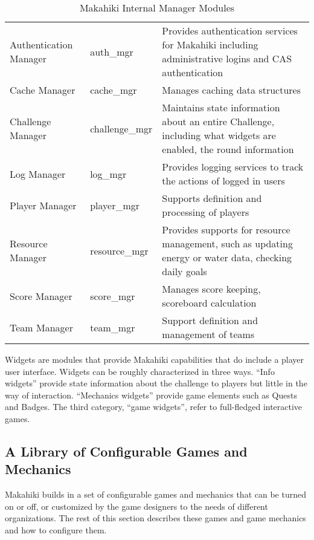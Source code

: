 \begin{table}[ht!]
  \centering
  \begin{tabular}{|P{0.2\columnwidth}|p{0.15\columnwidth}|p{0.55\columnwidth}|}
    \hline
     &  &  \\
    \hline
    Authentication Manager & auth\_mgr &
    Provides authentication services for Makahiki including administrative logins and CAS authentication \\
    \hline
    Cache Manager &  cache\_mgr &
    Manages caching data structures \\
    \hline
    Challenge Manager & challenge\_mgr &
    Maintains state information about an entire Challenge, including what widgets are enabled, the round information \\
    \hline
    Log Manager &  log\_mgr &
    Provides logging services to track the actions of logged in users \\
    \hline
    Player Manager & player\_mgr &
    Supports definition and processing of players \\
    \hline
    Resource Manager & resource\_mgr &
    Provides supports for resource management, such as updating energy or water data, checking daily goals \\
    \hline
    Score Manager &  score\_mgr &
    Manages score keeping, scoreboard calculation \\
    \hline
    Team Manager & team\_mgr &
    Support definition and management of teams \\
    \hline
  \end{tabular}
  \caption{Makahiki Internal Manager Modules}
  \label{table:managers}
\end{table}

Widgets are modules that provide Makahiki capabilities that do include a player user interface. Widgets can be roughly characterized in three ways. ``Info widgets'' provide state information about the challenge to players but little in the way of interaction. ``Mechanics widgets'' provide game elements such as Quests and Badges. The third category, ``game widgets'', refer to full-fledged interactive games.

\subsection{A Library of Configurable Games and Mechanics}

Makahiki builds in a set of configurable games and mechanics that can be turned on or off, or customized by the game designers to the needs of different organizations. The rest of this section describes these games and game mechanics and how to configure them.

